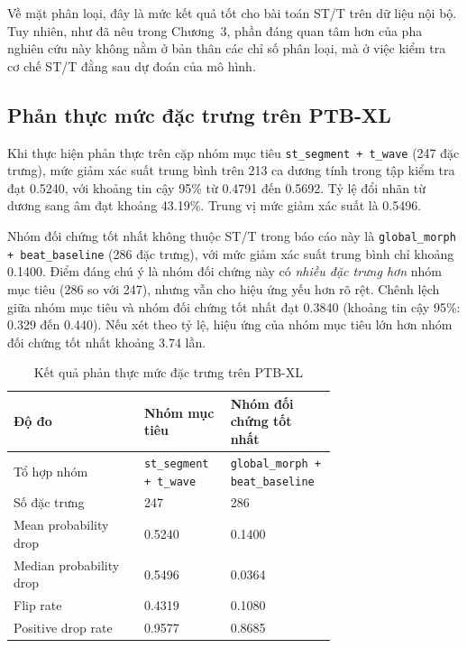 \blocksep

Về mặt phân loại, đây là mức kết quả tốt cho bài toán ST/T trên dữ liệu nội bộ. Tuy nhiên, như đã nêu trong Chương~3, phần đáng quan tâm hơn của pha nghiên cứu này không nằm ở bản thân các chỉ số phân loại, mà ở việc kiểm tra cơ chế ST/T đằng sau dự đoán của mô hình.

\blocksep

\subsection{Phản thực mức đặc trưng trên PTB-XL}

\blocksep

Khi thực hiện phản thực trên cặp nhóm mục tiêu \texttt{st\_segment + t\_wave} (247 đặc trưng), mức giảm xác suất trung bình trên 213 ca dương tính trong tập kiểm tra đạt 0.5240, với khoảng tin cậy 95\% từ 0.4791 đến 0.5692. Tỷ lệ đổi nhãn từ dương sang âm đạt khoảng 43.19\%. Trung vị mức giảm xác suất là 0.5496.

\blocksep

Nhóm đối chứng tốt nhất không thuộc ST/T trong báo cáo này là \texttt{global\_morph + beat\_baseline} (286 đặc trưng), với mức giảm xác suất trung bình chỉ khoảng 0.1400. Điểm đáng chú ý là nhóm đối chứng này có \textit{nhiều đặc trưng hơn} nhóm mục tiêu (286 so với 247), nhưng vẫn cho hiệu ứng yếu hơn rõ rệt. Chênh lệch giữa nhóm mục tiêu và nhóm đối chứng tốt nhất đạt 0.3840 (khoảng tin cậy 95\%: 0.329 đến 0.440). Nếu xét theo tỷ lệ, hiệu ứng của nhóm mục tiêu lớn hơn nhóm đối chứng tốt nhất khoảng 3.74 lần.

\begin{table}[H]
\centering
\caption{Kết quả phản thực mức đặc trưng trên PTB-XL}
\label{tab:phase2_ptbxl_cf}
\begin{tabular}{p{0.35\linewidth}C{0.18\linewidth}C{0.18\linewidth}}
\hline
\textbf{Độ đo} & \textbf{Nhóm mục tiêu} & \textbf{Nhóm đối chứng tốt nhất} \\
\hline
Tổ hợp nhóm & \texttt{st\_segment + t\_wave} & \texttt{global\_morph + beat\_baseline} \\
Số đặc trưng & 247 & 286 \\
Mean probability drop & 0.5240 & 0.1400 \\
Median probability drop & 0.5496 & 0.0364 \\
Flip rate & 0.4319 & 0.1080 \\
Positive drop rate & 0.9577 & 0.8685 \\
\hline
\end{tabular}
\end{table}

